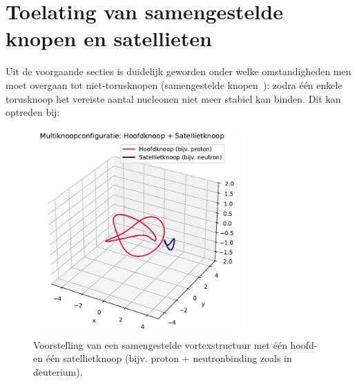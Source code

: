 \section{Toelating van samengestelde knopen en satellieten}

Uit de voorgaande secties is duidelijk geworden onder welke omstandigheden men moet overgaan tot niet-torusknopen (samengestelde knopen~\cite{Faddeev1997KnottedSolitions}): zodra
één enkele torusknoop het vereiste aantal nucleonen niet meer stabiel kan binden. Dit kan optreden bij:

\begin{figure}[H]
    \centering
    \includegraphics[width=0.7\textwidth]{../8_multiknoop}
    \caption{Voorstelling van een samengestelde vortexstructuur met één hoofd- en één satellietknoop (bijv. proton + neutronbinding zoals in deuterium).}
    \label{fig:satellietknoop}
\end{figure}

